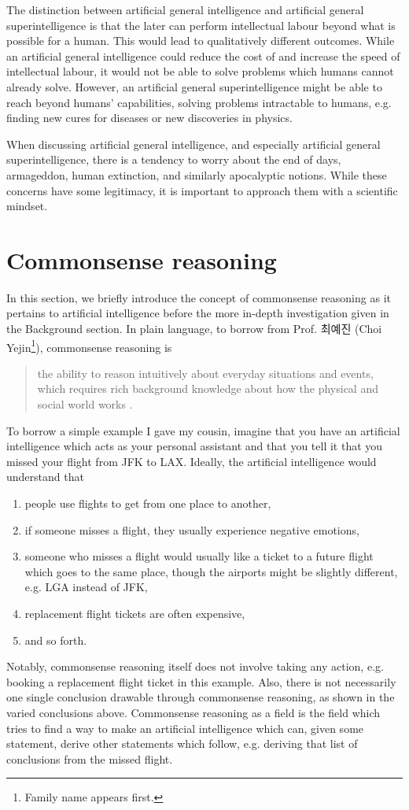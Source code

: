 \documentclass[12pt]{report}
\begin{document}
The distinction between artificial general intelligence and artificial general superintelligence is that the later can perform intellectual labour beyond what is possible for a human.
This would lead to qualitatively different outcomes.
While an artificial general intelligence could reduce the cost of and increase the speed of intellectual labour, it would not be able to solve problems which humans cannot already solve.
However, an artificial general superintelligence might be able to reach beyond humans' capabilities, solving problems intractable to humans, e.g. finding new cures for diseases or new discoveries in physics.

When discussing artificial general intelligence, and especially artificial general superintelligence, there is a tendency to worry about the end of days, armageddon, human extinction, and similarly apocalyptic notions.
While these concerns have some legitimacy, it is important to approach them with a scientific mindset.


\section{Commonsense reasoning}
In this section, we briefly introduce the concept of commonsense reasoning as it pertains to artificial intelligence before the more in-depth investigation given in the Background section.
In plain language, to borrow from Prof. 최예진 (Choi Yejin\footnote{Family name appears first.}), commonsense reasoning is
\begin{quote}
    the ability to reason intuitively about everyday situations and events, which requires rich background knowledge about how  the physical and social world works \cite{Choi2022-to}.
\end{quote}
To borrow a simple example I gave my cousin, imagine that you have an artificial intelligence which acts as your personal assistant and that you tell it that you missed your flight from JFK to LAX.
Ideally, the artificial intelligence would understand that
\begin{enumerate}[nolistsep]
    \item people use flights to get from one place to another,
    \item if someone misses a flight, they usually experience negative emotions,
    \item someone who misses a flight would usually like a ticket to a future flight which goes to the same place, though the airports might be slightly different, e.g. LGA instead of JFK,
    \item replacement flight tickets are often expensive,
    \item and so forth.
\end{enumerate}
Notably, commonsense reasoning itself does not involve taking any action, e.g. booking a replacement flight ticket in this example.
Also, there is not necessarily one single conclusion drawable through commonsense reasoning, as shown in the varied conclusions above.
Commonsense reasoning as a field is the field which tries to find a way to make an artificial intelligence which can, given some statement, derive other statements which follow, e.g. deriving that list of conclusions from the missed flight.
\end{document}
